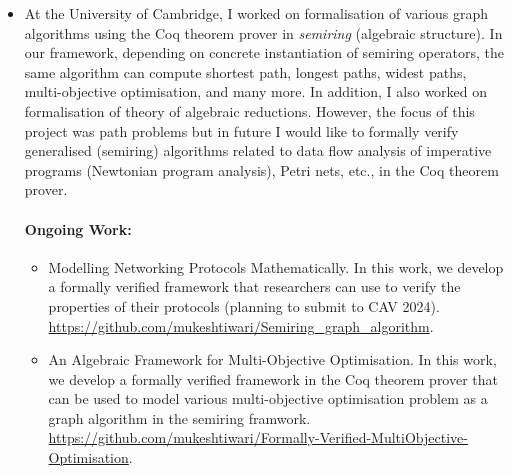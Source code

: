 \documentclass[a4paper]{article}
\begin{document}
\begin{itemize}
\item At the University of Cambridge, I worked on formalisation of 
various graph algorithms using the Coq theorem prover in \emph{semiring} 
(algebraic structure). In our framework, depending on concrete 
instantiation of semiring operators,
the same algorithm can compute shortest path, longest paths, widest paths, 
multi-objective optimisation, and many more. In addition, 
I also worked on formalisation of theory of algebraic reductions. 
However, the focus of this project was path problems but in future I would 
like to formally verify generalised (semiring) algorithms related to 
data flow analysis of imperative programs (Newtonian program analysis), Petri nets, etc., 
in the Coq theorem prover.


 
\paragraph{Ongoing Work:} 
\begin{itemize}
\item Modelling Networking Protocols Mathematically. In this work, we develop 
a formally verified framework that researchers can use to verify 
the properties of their protocols (planning to submit to CAV 2024).
\url{https://github.com/mukeshtiwari/Semiring_graph_algorithm}. 


\item {An Algebraic Framework for Multi-Objective Optimisation. In this work, we develop 
a formally verified framework in the Coq theorem prover that can be used to model 
various multi-objective 
optimisation problem as a graph algorithm in the semiring framwork.
\url{https://github.com/mukeshtiwari/Formally-Verified-MultiObjective-Optimisation}}.
\end{itemize}	
\end{itemize}
\end{document}
